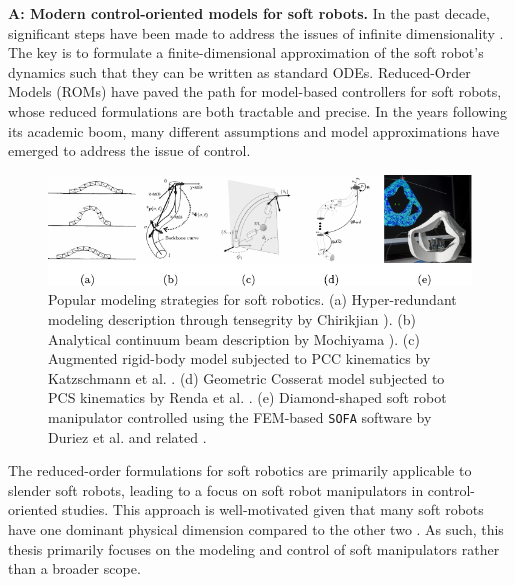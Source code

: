 \textbf{A: Modern control-oriented models for soft robots.} In the past decade, significant steps have been made to address the issues of infinite dimensionality \cite{DellaSantina2021}. The key is to formulate a finite-dimensional approximation of the soft robot's dynamics such that they can be written as standard ODEs. Reduced-Order Models (ROMs) have paved the path for model-based controllers for soft robots, whose reduced formulations are both tractable and precise. In the years following its academic boom, many different assumptions and model approximations have emerged to address the issue of control.
%
\begin{figure}[!t]
  \centering
  \includegraphics*[width=1.0\textwidth]{./pdf/thesis-figure-1-4.pdf}
  \caption{Popular modeling strategies for soft robotics. (a) Hyper-redundant modeling description through tensegrity by Chirikjian \cite{Chirikjian1992,Chirikjian1994}). (b) Analytical continuum beam description by Mochiyama \cite{Mochiyama1999,Mochiyama2003}). (c) Augmented rigid-body model subjected to PCC kinematics by Katzschmann et al. \cite{Katzschmann2019}. (d) Geometric Cosserat model subjected to PCS kinematics by Renda et al. \cite{Renda2018}. (e) Diamond-shaped soft robot manipulator controlled using the FEM-based \texttt{SOFA} software by Duriez et al. \cite{Duriez2013} and related \cite{Coevoet2017,Goury2018}.}
  \label{fig:C0:modeltypes}
  \vspace{-5mm}
\end{figure}
%
\begin{rmk}
 The reduced-order formulations for soft robotics are primarily applicable to slender soft robots, leading to a focus on soft robot manipulators in control-oriented studies. This approach is well-motivated given that many soft robots have one dominant physical dimension compared to the other two \cite{DellaSantina2021}. As such, this thesis primarily focuses on the modeling and control of soft manipulators rather than a broader scope.
\end{rmk}
